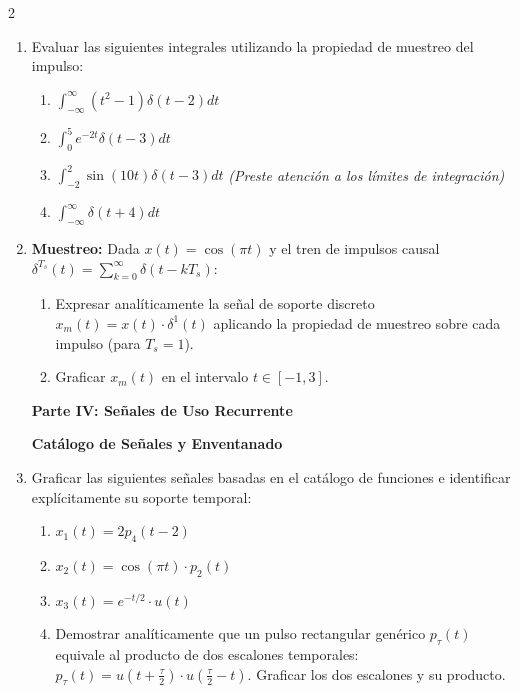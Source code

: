 \documentclass[10pt,a4paper]{article}
\begin{document}
\begin{multicols}{2}
\begin{enumerate}
            \item Evaluar las siguientes integrales utilizando la propiedad de muestreo del impulso:
            \begin{enumerate}
                \item $\int_{-\infty}^{\infty} (t^2 - 1) \delta(t-2) dt$
                \item $\int_{0}^{5} e^{-2t} \delta(t-3) dt$
                \item $\int_{-2}^{2} \sin(10t) \delta(t-3) dt$ \quad \textit{(Preste atención a los límites de integración)}
                \item $\int_{-\infty}^{\infty} \delta(t+4) dt$
            \end{enumerate}

            \item \textbf{Muestreo:} Dada $x(t) = \cos(\pi t)$ y el tren de impulsos causal $\delta^{T_s}(t) = \sum_{k=0}^{\infty} \delta(t - k T_s)$:
            \begin{enumerate}
                \item Expresar analíticamente la señal de soporte discreto $x_m(t) = x(t) \cdot \delta^{1}(t)$ aplicando la propiedad de muestreo sobre cada impulso (para $T_s = 1$).
                \item Graficar $x_m(t)$ en el intervalo $t \in [-1, 3]$.
            \end{enumerate}

		\vspace{1em}
		\begin{center}
			\textbf{\large Parte IV: Señales de Uso Recurrente}
		\end{center}
		\vspace{-0.5em}

            \textbf{Catálogo de Señales y Enventanado}
            \item Graficar las siguientes señales basadas en el catálogo de funciones e identificar explícitamente su soporte temporal:
            \begin{enumerate}
                \item $x_1(t) = 2 p_{4}(t - 2)$
                \item $x_2(t) = \cos(\pi t) \cdot p_2(t)$
                \item $x_3(t) = e^{-t/2} \cdot u(t)$
                \item Demostrar analíticamente que un pulso rectangular genérico $p_\tau(t)$ equivale al producto de dos escalones temporales: $p_\tau(t) = u\left(t + \frac{\tau}{2}\right) \cdot u\left(\frac{\tau}{2} - t\right)$. Graficar los dos escalones y su producto.
            \end{enumerate}

		\end{enumerate}
	\end{multicols}
\end{document}
